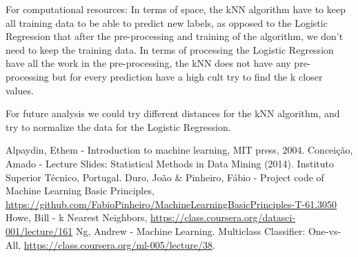 \documentclass[twoside]{article}
\begin{document}
\begin{multicols}{2}
\par
For computational resources:
In terms of space, the kNN algorithm have to keep all training data to be able to predict new labels, as opposed to the Logistic Regression that after the pre-processing and training of the algorithm, we don't need to keep the training data.
	In terms of processing the Logistic Regression have all the work in the pre-processing,  the kNN does not have any pre-processing but for every prediction have a high cult try to find the k closer values.
\par
For future analysis we could try different distances for the kNN algorithm, and try to normalize the data for the Logistic Regression.




%
%


{}
\begin{thebibliography}{}	
  Alpaydin, Ethem -   
  Introduction to machine learning, 
  MIT press,
  2004.
  Concei\c{c}\~{a}o, Amado -
  Lecture Slides: Statistical Methods in Data Mining (2014). Instituto Superior Técnico, Portugal.
  Duro, Jo\~{a}o \& Pinheiro, F\'{a}bio - Project code of Machine Learning Basic Principles,
  \url{https://github.com/FabioPinheiro/MachineLearningBasicPrinciples-T-61.3050}
  Howe, Bill - k Nearest Neighbors,
  \url{https://class.coursera.org/datasci-001/lecture/161}
  Ng, Andrew - 
  Machine Learning. Multiclass Classifier: One-vs-All,
  \url{https://class.coursera.org/ml-005/lecture/38}.

\end{thebibliography}
\end{multicols}
\newpage
\end{document}
